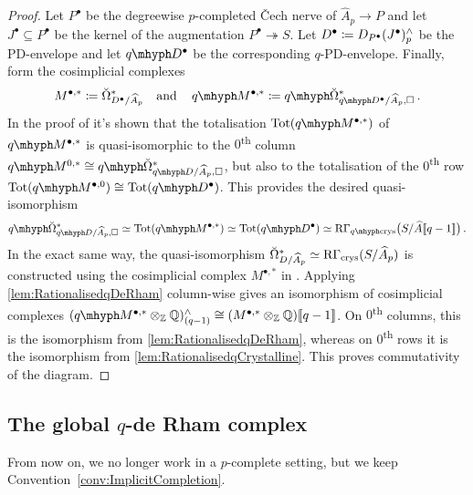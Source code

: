 \documentclass[DIV=12,numbers=enddot,leqno,bibliography=totoc]{scrartcl}
\begin{document}
	\begin{proof}
		Let $P^\bullet$ be the degreewise $p$-completed \v Cech nerve of $\widehat{A}_p\rightarrow P$ and let $J^\bullet\subseteq P^\bullet$ be the kernel of the augmentation $P^\bullet\twoheadrightarrow S$. Let $D^\bullet\coloneqq D_{P^\bullet}(J^\bullet)_p^\complete$ be the PD-envelope and let $\q D^\bullet$ be the corresponding $q$-PD-envelope. Finally, form the cosimplicial complexes
		\begin{equation*}
			M^{\bullet,*}\coloneqq \breve{\Omega}_{D^\bullet/\smash{\widehat{A}}_p}^*\quad\text{and}\quad\q M^{\bullet,*}\coloneqq  \q\breve{\Omega}_{\q D^\bullet/\smash{\widehat{A}}_p, \square}^*\,.
		\end{equation*}
		In the proof of \cite[Theorem~\textup{}]{Prismatic} it's shown that the totalisation $\Tot(\q M^{\bullet,*})$ of $\q M^{\bullet,*}$ is quasi-isomorphic to the $0$\textsuperscript{th} column $\q M^{0,*}\cong \q\breve{\Omega}_{\q D/\smash{\widehat{A}}_p, \square}^*$, but also to the totalisation of the $0$\textsuperscript{th} row $\Tot(\q M^{\bullet,0})\cong \Tot(\q D^\bullet)$. This provides the desired quasi-isomorphism
		\begin{equation*}
			\q\breve{\Omega}_{\q D/\smash{\widehat{A}}_p, \square}^*\simeq \Tot(\q M^{\bullet,*})\simeq \Tot(\q D^\bullet)\simeq \R\Gamma_\qcrys\bigl(S/\widehat{A}\qpower\bigr)\,.
		\end{equation*}
		In the exact same way, the quasi-isomorphism $\breve{\Omega}_{D/\smash{\widehat{A}}_p}^*\simeq \mathrm{R}\Gamma_{\mathrm{crys}}(S/\widehat{A}_p)$ is constructed using the cosimplicial complex $M^{\bullet,*}$ in \cite[]{Stacks}. Applying \cref{lem:RationalisedqDeRham} column-wise gives an isomorphism of cosimplicial complexes $(\q M^{\bullet,*}\otimes_{\IZ}\IQ)_{(q-1)}^\complete\cong (M^{\bullet,*}\otimes_{\IZ}\IQ)\qpower$. On $0$\textsuperscript{th} columns, this is the isomorphism from \cref{lem:RationalisedqDeRham}, whereas on $0$\textsuperscript{th} rows it is the isomorphism from \cref{lem:RationalisedqCrystalline}. This proves commutativity of the diagram.
	\end{proof}
	
	\subsection{The global \texorpdfstring{$q$}{q}-de Rham complex}
	From now on, we no longer work in a $p$-complete setting, but we keep Convention~\cref{conv:ImplicitCompletion}. 
	
\end{document}
